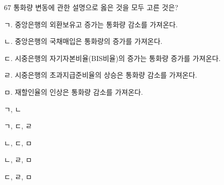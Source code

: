 \begin{question}{67}
통화량 변동에 관한 설명으로 옳은 것을 모두 고른 것은?
\begin{framedtext}
ㄱ. 중앙은행의 외환보유고 증가는 통화량 감소를 가져온다. \par
ㄴ. 중앙은행의 국채매입은 통화량의 증가를 가져온다. \par
ㄷ. 시중은행의 자기자본비율(BIS비율)의 증가는 통화량 증가를 가져온다. \par
ㄹ. 시중은행의 초과지급준비율의 상승은 통화량 감소를 가져온다. \par
ㅁ. 재할인율의 인상은 통화량 감소를 가져온다. \par
\end{framedtext}
\begin{choices}
  \item ㄱ, ㄴ
  \item ㄱ, ㄷ, ㄹ
  \item ㄴ, ㄷ, ㅁ
  \item ㄴ, ㄹ, ㅁ
  \item ㄷ, ㄹ, ㅁ
\end{choices}
\end{question}
